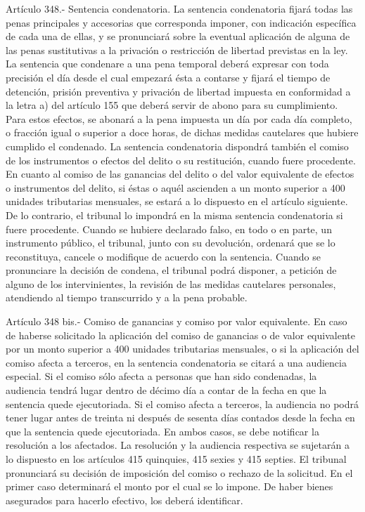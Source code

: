     Artículo 348.- Sentencia condenatoria. La sentencia condenatoria fijará todas las penas principales y accesorias que corresponda imponer, con indicación específica de cada una de ellas, y se pronunciará sobre la eventual aplicación de alguna de las penas sustitutivas a la privación o restricción de libertad previstas en la ley.
    La sentencia que condenare a una pena temporal deberá expresar con toda precisión el día desde el cual empezará ésta a contarse y fijará el tiempo de detención, prisión preventiva y privación de libertad impuesta en conformidad a la letra a) del artículo 155 que deberá servir de abono para su cumplimiento. Para estos efectos, se abonará a la pena impuesta un día por cada día completo, o fracción igual o superior a doce horas, de dichas medidas cautelares que hubiere cumplido el condenado.
    La sentencia condenatoria dispondrá también el comiso de los instrumentos o efectos del delito o su restitución, cuando fuere procedente. En cuanto al comiso de las ganancias del delito o del valor equivalente de efectos o instrumentos del delito, si éstas o aquél ascienden a un monto superior a 400 unidades tributarias mensuales, se estará a lo dispuesto en el artículo siguiente. De lo contrario, el tribunal lo impondrá en la misma sentencia condenatoria si fuere procedente.
    Cuando se hubiere declarado falso, en todo o en parte, un instrumento público, el tribunal, junto con su devolución, ordenará que se lo reconstituya, cancele o modifique de acuerdo con la sentencia.
    Cuando se pronunciare la decisión de condena, el tribunal podrá disponer, a petición de alguno de los intervinientes, la revisión de las medidas cautelares personales, atendiendo al tiempo transcurrido y a la pena probable.





    Artículo 348 bis.- Comiso de ganancias y comiso por valor equivalente. En caso de haberse solicitado la aplicación del comiso de ganancias o de valor equivalente por un monto superior a 400 unidades tributarias mensuales, o si la aplicación del comiso afecta a terceros, en la sentencia condenatoria se citará a una audiencia especial.
    Si el comiso sólo afecta a personas que han sido condenadas, la audiencia tendrá lugar dentro de décimo día a contar de la fecha en que la sentencia quede ejecutoriada. Si el comiso afecta a terceros, la audiencia no podrá tener lugar antes de treinta ni después de sesenta días contados desde la fecha en que la sentencia quede ejecutoriada. En ambos casos, se debe notificar la resolución a los afectados.
    La resolución y la audiencia respectiva se sujetarán a lo dispuesto en los artículos 415 quinquies, 415 sexies y 415 septies.
    El tribunal pronunciará su decisión de imposición del comiso o rechazo de la solicitud. En el primer caso determinará el monto por el cual se lo impone. De haber bienes asegurados para hacerlo efectivo, los deberá identificar.

